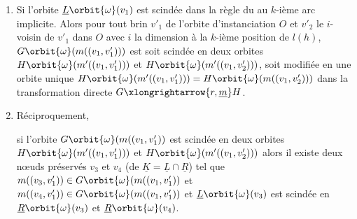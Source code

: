 \begin{proposition}
\begin{enumerate}
		\item Si l'orbite $\underline{L}\orbit{\omega}(v_1)$ est scindée dans la règle du au $k$-ième arc implicite.
		      Alors pour tout brin $v'_1$ de l'orbite d'instanciation $O$ et $v'_2$ le $i$-voisin de $v'_1$ dans $O$ avec $i$ la dimension à la $k$-ième position de $l(h)$, $G\orbit{\omega}(m((v_1,v'_1)))$ est soit scindée en deux orbites
		      $H\orbit{\omega}(m'((v_1, v'_1)))$ et $H\orbit{\omega}(m'((v_1,v'_2)))$, soit modifiée en une orbite unique $H\orbit{\omega}(m'((v_1, v'_1))) = H\orbit{\omega}(m((v_1,v'_2)))$ dans la transformation directe
		      $G \xlongrightarrow{r, \underline{m}} H$.

		\item Réciproquement,

		      si l'orbite $G\orbit{\omega}(m((v_1, v'_1))$ est scindée en deux orbites
		      $H\orbit{\omega}(m'((v_1, v'_1)))$ et $H\orbit{\omega}(m'((v_1,v'_2)))$ alors il existe deux n\oe uds préservés $v_3$ et $v_4$ (de $\underline{K} = \underline{L} \cap \underline{R}$) tel que $m((v_3, v'_1)) \in G\orbit{\omega}(m((v_1, v'_1))$ et $m((v_4, v'_1)) \in G\orbit{\omega}(m((v_1, v'_1))$ et $\underline{L}\orbit{\omega}(v_3)$ est scindée en $\underline{R}\orbit{\omega}(v_3)$ et $\underline{R}\orbit{\omega}(v_4)$. %

	\end{enumerate}

\end{proposition}

